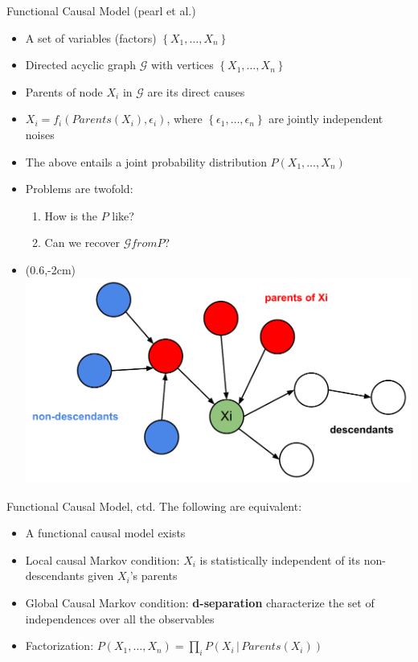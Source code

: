 \begin{frame}{Functional Causal Model (pearl et al.)} 
\begin{itemize}[<+->]
\item A set of variables (factors) $\left\lbrace X_1,\ldots,X_n \right\rbrace$
\item Directed acyclic graph $\mathcal{G}$ with vertices $\left\lbrace X_1,\ldots,X_n \right\rbrace$
\item Parents of node $X_i$ in $\mathcal{G}$ are its direct causes
\item $X_i=f_i(Parents(X_i),\epsilon_i)$, where $\left\lbrace\epsilon_1,\ldots,\epsilon_n\right\rbrace$ are jointly independent noises
\item The above entails a joint probability distribution $P(X_1,\ldots,X_n)$
\item Problems are twofold:
      \begin{enumerate}
		\item How is the $P$ like?
		\item Can we recover $\mathcal{G} from P$? 
	\end{enumerate}
\item[] \begin{textblock*}{200mm}(0.6\textwidth,-2cm)
		\includegraphics[scale=0.25]{imgs/causalgm}
	\end{textblock*}
\end{itemize}
\end{frame}
\begin{frame}{Functional Causal Model, ctd.}
The following are equivalent:
\begin{itemize}
\item A functional causal model exists
\item Local causal Markov condition: $X_i$ is statistically independent of its non-descendants given $X_i$'s parents
\item Global Causal Markov condition: \textbf{d-separation} characterize the set of independences over all the observables
\item Factorization: $P(X_1,\ldots,X_n)=\prod_iP(X_i\,|\,Parents(X_i))$
\end{itemize}
\end{frame}
